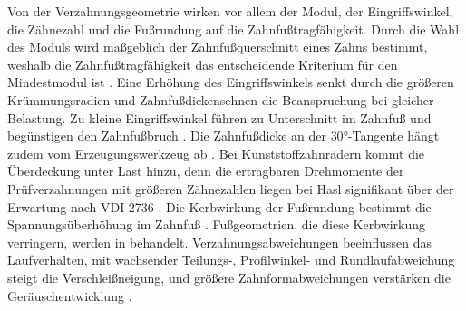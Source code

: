 Von der Verzahnungsgeometrie wirken vor allem der Modul, der Eingriffswinkel, die Zähnezahl und die Fußrundung auf die Zahnfußtragfähigkeit. Durch die Wahl des Moduls wird maßgeblich der Zahnfußquerschnitt eines Zahns bestimmt, weshalb die Zahnfußtragfähigkeit das entscheidende Kriterium für den Mindestmodul ist \cite[S.~93]{KloBre17}. Eine Erhöhung des Eingriffswinkels senkt durch die größeren Krümmungsradien und Zahnfußdickensehnen die Beanspruchung bei gleicher Belastung. Zu kleine Eingriffswinkel führen zu Unterschnitt im Zahnfuß und begünstigen den Zahnfußbruch \cite[S.~31 und 95]{KloBre17}. Die Zahnfußdicke an der $30$°-Tangente hängt zudem vom Erzeugungswerkzeug ab \cite[S.~121]{Lin10}. Bei Kunststoffzahnrädern kommt die Überdeckung unter Last hinzu, denn die ertragbaren Drehmomente der Prüfverzahnungen mit größeren Zähnezahlen liegen bei Hasl signifikant über der Erwartung nach VDI 2736 \cite[S.~134]{Has18}. Die Kerbwirkung der Fußrundung bestimmt die Spannungsüberhöhung im Zahnfuß \cite[S.~2]{Kas22}. Fußgeometrien, die diese Kerbwirkung verringern, werden in  behandelt. Verzahnungsabweichungen beeinflussen das Laufverhalten, mit wachsender Teilungs-, Profilwinkel- und Rundlaufabweichung steigt die Verschleißneigung, und größere Zahnformabweichungen verstärken die Geräuschentwicklung \cite[S.~30]{VDI2736-1}.

